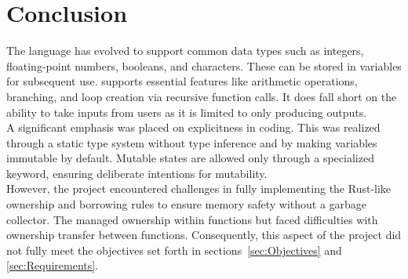 \section{Conclusion}
\label{sec:conclusion}

The \lang{} language has evolved to support common data types such as integers,
floating-point numbers, booleans, and characters. These can be stored in variables
for subsequent use. \lang{} supports essential features like arithmetic operations,
branching, and loop creation via recursive function calls. It does fall short on the
ability to take inputs from users as it is limited to only producing outputs. \\

A significant emphasis was placed on explicitness in coding. This was realized
through a static type system without type inference and by making variables
immutable by default. Mutable states are allowed only through a specialized keyword,
ensuring deliberate intentions for mutability. \\

However, the project encountered challenges in fully implementing the Rust-like
ownership and borrowing rules to ensure memory safety without a garbage collector.
The \borrowChecker{} managed ownership within functions but faced difficulties with
ownership transfer between functions. Consequently, this aspect of the project did
not fully meet the objectives set forth in sections~\ref{sec:Objectives} and
\ref{sec:Requirements}.



\newpage
